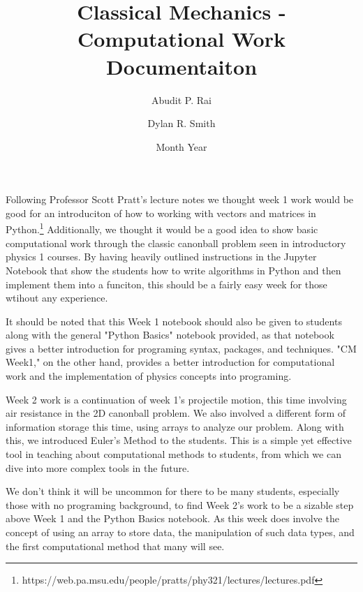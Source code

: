 \documentclass[12pt, letterpaper, twoside]{report}
\title{Classical Mechanics - Computational Work Documentaiton}
\author{Abudit P. Rai} \author{Dylan R. Smith}\\ Department of Physics and Astronomy, Michigan State University}
\date{Month Year}
\begin{document}
\begin{titlepage}
	\maketitle
\end{titlepage}

Following Professor Scott Pratt's lecture notes we thought week 1 work would be good for an introduciton of how to working with vectors and matrices in Python.\thanks{https://web.pa.msu.edu/people/pratts/phy321/lectures/lectures.pdf} Additionally, we thought it would be a good idea to show basic computational work through the classic canonball problem seen in introductory physics 1 courses. By having heavily outlined instructions in the Jupyter Notebook that show the students how to write algorithms in Python and then implement them into a funciton, this should be a fairly easy week for those wtihout any experience. 


It should be noted that this Week 1 notebook should also be given to students along with the general "Python Basics" notebook provided, as that notebook gives a better introduction for programing syntax, packages, and techniques. "CM Week1," on the other hand, provides a better introduction for computational work and the implementation of physics concepts into programing. 


\newpage
Week 2 work is a continuation of week 1's projectile motion, this time involving air resistance in the 2D canonball problem. We also involved a different form of information storage this time, using arrays to analyze our problem. Along with this, we introduced Euler's Method to the students. This is a simple yet effective tool in teaching about computational methods to students, from which we can dive into more complex tools in the future. 

We don't think it will be uncommon for there to be many students, especially those with no programing background, to find Week 2's work to be a sizable step above Week 1 and the Python Basics notebook. As this week does involve the concept of using an array to store data, the manipulation of such data types, and the first computational method that many will see.
\end{document}
